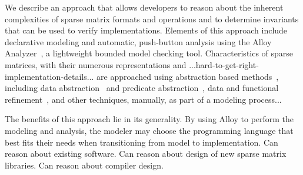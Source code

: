 We describe an approach that allows developers to reason about the inherent complexities of sparse matrix formats and operations and to determine invariants that can be used to verify implementations.
Elements of this approach include declarative modeling and automatic, push-button analysis using the Alloy Analyzer~\cite{jackson2012}, a lightweight bounded model checking tool.  Characteristics of sparse matrices, with their numerous representations and ...hard-to-get-right-implementation-details... are approached using abstraction based methods~\cite{clarke1994}, including data abstraction~\cite{dingel1995} and predicate abstraction~\cite{graf1997}, data and functional refinement~\cite{woodcock1996}, and other techniques, manually, as part of a modeling process...

The benefits of this approach lie in its generality.  By using Alloy to perform the modeling and analysis, the modeler may choose the programming language that best fits their needs when transitioning from model to implementation.
Can reason about existing software.
Can reason about design of new sparse matrix libraries.
Can reason about compiler design.
